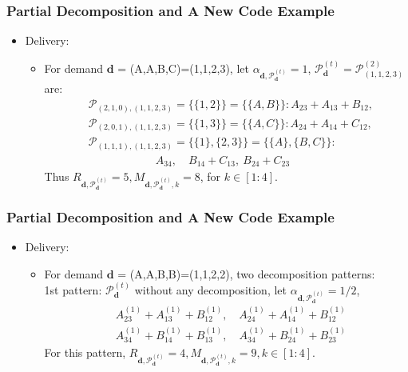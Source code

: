 \documentclass{beamer}
\begin{document}
\begin{frame}
\frametitle{Partial Decomposition and A New Code Example}
\begin{itemize}
\item Delivery:
	\begin{itemize}
	[circle]
	\item For demand $\boldsymbol{d}$ = (A,A,B,C)=(1,1,2,3), let $\alpha_{\boldsymbol{d},\boldsymbol{\mathcal{P}}_{\boldsymbol{d}}^{(t)}}=1$, $\boldsymbol{\mathcal{P}}_{\boldsymbol{d}}^{(t)}=\boldsymbol{\mathcal{P}}_{(1,1,2,3)}^{(2)}$ are: 
	\begin{align*}
	& \mathcal{P}_{(2,1,0),(1,1,2,3)} = \{\{1,2\}\} = \{\{A,B\}\}: A_{23} +A_{13} + B_{12},\\
	& \mathcal{P}_{(2,0,1),(1,1,2,3)} =  \{\{1,3\}\} = \{\{A,C\}\}: A_{24} +A_{14} + C_{12},\\
	& \mathcal{P}_{(1,1,1),(1,1,2,3)} = \{\{1\},\{2,3\}\} = \{\{A\},\{B,C\}\}: \\
	& \qquad \qquad  \qquad   A_{34}, \quad B_{14} + C_{13}, \ B_{24} + C_{23}
	\end{align*}
	Thus $R_{\boldsymbol{d},\boldsymbol{\mathcal{P}}_{\boldsymbol{d}}^{(t)}} = 5, M_{\boldsymbol{d},\boldsymbol{\mathcal{P}}_{\boldsymbol{d}}^{(t)},k} = 8$, for $k \in [1:4]$.
	\end{itemize}
\end{itemize}
\end{frame}

\begin{frame}
\frametitle{Partial Decomposition and A New Code Example}
\begin{itemize}
\item Delivery:
	\begin{itemize}
	[circle]
	\item For demand $\boldsymbol{d}$ = (A,A,B,B)=(1,1,2,2), two decomposition patterns: \\
	1st pattern: $\boldsymbol{\mathcal{P}}_{\boldsymbol{d}}^{(t)}$ without any decomposition, let $\alpha_{\boldsymbol{d},\boldsymbol{\mathcal{P}}_{\boldsymbol{d}}^{(t)}}=1/2$,
	\begin{align*}
	& A_{23}^{(1)} +A_{13}^{(1)}+B_{12}^{(1)}, \quad  A_{24}^{(1)} +A_{14}^{(1)}+B_{12}^{(1)} \\
	& A_{34}^{(1)} +B_{14}^{(1)}+B_{13}^{(1)} ,\quad  A_{34}^{(1)} +B_{24}^{(1)}+B_{23}^{(1)} 
	\end{align*}
	For this pattern, $R_{\boldsymbol{d},\boldsymbol{\mathcal{P}}_{\boldsymbol{d}}^{(t)}} = 4, M_{\boldsymbol{d},\boldsymbol{\mathcal{P}}_{\boldsymbol{d}}^{(t)},k} = 9, k \in [1:4]$.
	\end{itemize}
\end{itemize}
\end{frame}
\end{document}

